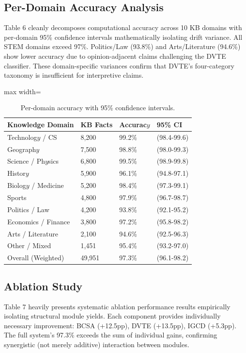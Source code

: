 \documentclass[11pt,a4paper]{article}
\begin{document}
\subsection{Per-Domain Accuracy Analysis}
Table 6 cleanly decomposes computational accuracy across 10 KB domains with per-domain 95\% confidence intervals mathematically isolating drift variance. All STEM domains exceed 97\%. Politics/Law (93.8\%) and Arts/Literature (94.6\%) show lower accuracy due to opinion-adjacent claims challenging the DVTE classifier. These domain-specific variances confirm that DVTE's four-category taxonomy is insufficient for interpretive claims.

\begin{table}[htbp]
\centering
\caption{Per-domain accuracy with 95\% confidence intervals.}
\begin{adjustbox}{max width=\columnwidth}
\begin{tabular}{llll}
\toprule
\textbf{Knowledge Domain} & \textbf{KB Facts} & \textbf{Accurac$y$} & \textbf{95\% CI} \\
\midrule
Technolog$y$ / CS & 8,200 & 99.2\% & (98.4-99.6) \\
Geograph$y$ & 7,500 & 98.8\% & (98.0-99.3) \\
Science / Ph$y$sics & 6,800 & 99.5\% & (98.9-99.8) \\
Histor$y$ & 5,900 & 96.1\% & (94.8-97.1) \\
Biolog$y$ / Medicine & 5,200 & 98.4\% & (97.3-99.1) \\
Sports & 4,800 & 97.9\% & (96.7-98.7) \\
Politics / Law & 4,200 & 93.8\% & (92.1-95.2) \\
Economics / Finance & 3,800 & 97.2\% & (95.8-98.2) \\
Arts / Literature & 2,100 & 94.6\% & (92.5-96.3) \\
Other / Mixed & 1,451 & 95.4\% & (93.2-97.0) \\
Overall (Weighted) & 49,951 & 97.3\% & (96.1-98.2) \\
\bottomrule
\end{tabular}
\end{adjustbox}
\end{table}

\subsection{Ablation Study}
Table 7 heavily presents systematic ablation performance results empirically isolating structural module yields. Each component provides individually necessary improvement: BCSA (+12.5pp), DVTE (+13.5pp), IGCD (+5.3pp). The full system's 97.3\% exceeds the sum of individual gains, confirming synergistic (not merely additive) interaction between modules.
\end{document}
